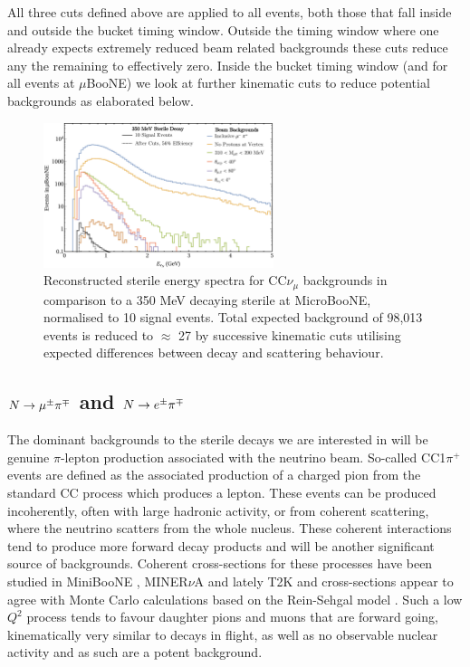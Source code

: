 \documentclass[11pt, a4paper]{article}
\def\muboone{MicroBooNE}
\def\minerva{MINER$\nu$A}
\def\ster{\ensuremath N}
\begin{document}
All three cuts defined above are applied to all events, both those that fall inside and outside the bucket timing window. Outside the timing window where one already expects extremely reduced beam related backgrounds these cuts reduce any the remaining to effectively zero. Inside the bucket timing window (and for all events at $\mu$BooNE) we look at further kinematic cuts to reduce potential backgrounds as elaborated below.

\begin{figure}[h]
\center
\includegraphics[width=0.6\textwidth,clip,trim=0 0 0 0]{figures/mu_pi_cutflow.pdf}

\caption{\label{fig:mu_pi_cutflow} Reconstructed sterile energy spectra for
CC$\nu_\mu$ backgrounds in comparison to a 350 MeV decaying sterile at
\muboone, normalised to 10 signal events. Total expected background of 98,013
events is reduced to $\approx$ 27 by successive kinematic cuts utilising
expected differences between decay and scattering behaviour. }

\end{figure}

\subsection{$\ster \rightarrow \mu^\pm \pi^\mp$ and $\ster \rightarrow e^\pm \pi^\mp$   }

The dominant backgrounds to the sterile decays we are interested in will be
genuine $\pi$-lepton production associated with the neutrino beam. So-called
CC1$\pi^+$ events are defined as the associated production of a charged pion
from the standard CC process which produces a lepton. These events can be
produced incoherently, often with large hadronic activity, or from coherent
scattering, where the neutrino scatters from the whole nucleus. These coherent
interactions tend to produce more forward decay products and will be another
significant source of backgrounds. Coherent cross-sections for these processes
have been studied in MiniBooNE \cite{Wascko:2006tx}, \minerva
\cite{Eberly:2014mra} and lately T2K and cross-sections appear to agree with
Monte Carlo calculations based on the Rein-Sehgal model \cite{Rein:2006di,
Rein:1982pf}.  Such a low $Q^2$ process tends to favour daughter pions and
muons that are forward going, kinematically very similar to decays in flight,
as well as no observable nuclear activity and as such are a potent
background.\\ 
\end{document}
